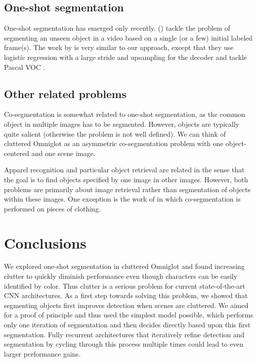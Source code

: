 \documentclass{article}
\begin{document}
\subsection{One-shot segmentation}

One-shot segmentation has emerged only recently.
\citeauthor{Caelles2017} (\citeyear{Caelles2017}) tackle the problem of segmenting an unseen object in a video based on a single (or a few) initial labeled frame(s).
The work by \citeauthor{Shaban2017a} \citeyearpar{Shaban2017a} is very similar to our approach, except that they use logistic regression with a large stride and upsampling for the decoder and tackle Pascal VOC \cite{Everingham2012}.




\subsection{Other related problems}

Co-segmentation \cite{Faktor2013,Quan2016,Sharma2017} is somewhat related to one-shot segmentation, as the common object in multiple images has to be segmented. However, objects are typically quite salient (otherwise the problem is not well defined). We can think of cluttered Omniglot as an asymmetric co-segmentation problem with one object-centered and one scene image.

Apparel recognition \cite{HadiKiapour2015, Zhao2016,Cheng2017b} and particular object retrieval \cite{Razavian2014a,Tolias2016,Li2017d,Simeoni2017} are related in the sense that the goal is to find objects specified by one image in other images.
However, both problems are primarily about image retrieval rather than segmentation of objects within these images.
One exception is the work of \citeauthor{Zhao2016} \citeyearpar{Zhao2016} in which co-segmentation is performed on pieces of clothing.




\section{Conclusions}
\label{sec:conclusions}

We explored one-shot segmentation in cluttered Omniglot and found increasing clutter to quickly diminish performance even though characters can be easily identified by color. Thus clutter is a serious problem for current state-of-the-art CNN architectures.
As a first step towards solving this problem, we showed that segmenting objects first improves detection when scenes are cluttered. We aimed for a proof of principle and thus used the simplest model possible, which performs only one iteration of segmentation and then decides directly based upon this first segmentation. Fully recurrent architectures that iteratively refine detection and segmentation by cycling through this process multiple times could lead to even larger performance gains.
\end{document}
